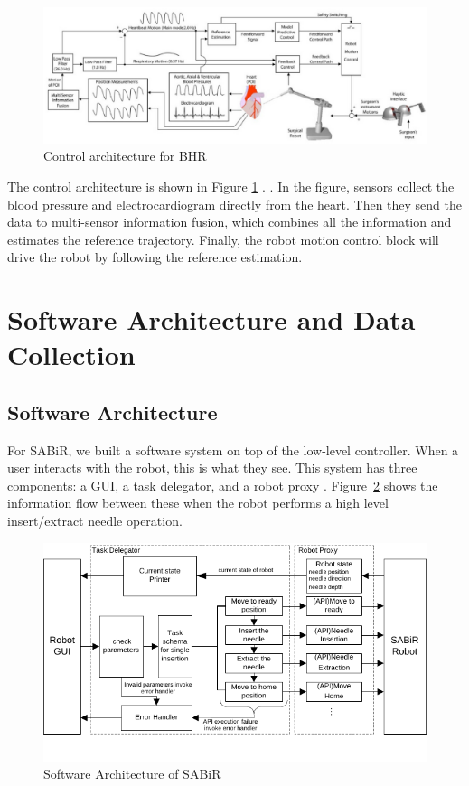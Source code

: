 \begin{figure}[!thpb]
\centering
\includegraphics[width=\textwidth]{chapter5_BHR_control.pdf}
\caption{Control architecture for BHR}
\label{bhrcontrol}
\end{figure}

The control architecture is shown in Figure \ref{bhrcontrol} \cite{bebek2007whisker, tuna2013heart}. . In the figure, sensors collect the blood pressure and electrocardiogram directly from the heart. Then they send the data to multi-sensor information fusion, which combines all the information and estimates the reference trajectory. Finally, the robot motion control block will drive the robot by following the reference estimation.

\section{Software Architecture and Data Collection}\label{softwareframe}

\subsection{Software Architecture}
For SABiR, we built a software system on top of the low-level controller. When a user interacts with the robot, this is what they see.  This system has three components: a GUI, a task delegator, and a robot proxy \cite{liangframework}. Figure~\ref{sabirsw} shows the information flow between these when the robot performs a high level insert/extract needle operation.

\begin{figure}[!thpb]
\centering
\includegraphics[width=\textwidth]{chapter5_SABiRsw.pdf}
\caption{Software Architecture of SABiR}
\label{sabirsw}
\end{figure}

